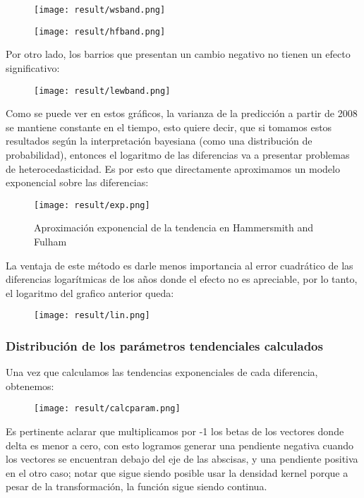 \documentclass[12pt]{article}
\begin{document}
\begin{figure}[H]
\centering
\texttt{[image: result/wsband.png]}
\end{figure}

\begin{figure}[H]
\centering
\texttt{[image: result/hfband.png]}
\end{figure}

Por otro lado, los barrios que presentan un cambio negativo no tienen un efecto significativo:

\begin{figure}[H]
\centering
\texttt{[image: result/lewband.png]}
\end{figure}

Como se puede ver en estos gráficos, la varianza de la predicción a partir de 2008 se mantiene constante en el tiempo, esto quiere decir, que si tomamos estos resultados según la interpretación bayesiana (como una distribución de probabilidad), entonces el logaritmo de las diferencias va a presentar problemas de heterocedasticidad.
Es por esto que directamente aproximamos un modelo exponencial sobre las diferencias:

\begin{figure}[H]
\centering
\texttt{[image: result/exp.png]}
\caption{Aproximación exponencial de la tendencia en Hammersmith and Fulham}
\end{figure}

La ventaja de este método es darle menos importancia al error cuadrático de las diferencias logarítmicas de los años donde el efecto no es apreciable, por lo tanto, el logaritmo del grafico anterior queda:

\begin{figure}[H]
\centering
\texttt{[image: result/lin.png]}
\end{figure}

\subsubsection{Distribución de los parámetros tendenciales calculados}
Una vez que calculamos las tendencias exponenciales de cada diferencia, obtenemos:

\begin{figure}[H]
\centering
\texttt{[image: result/calcparam.png]}
\end{figure}

Es pertinente aclarar que multiplicamos por -1 los betas de los vectores donde delta es menor a cero, con esto logramos generar una pendiente negativa cuando los vectores se encuentran debajo del eje de las abscisas, y una pendiente positiva en el otro caso; notar que sigue siendo posible usar la densidad kernel porque a pesar de la transformación, la función sigue siendo continua.
\end{document}
